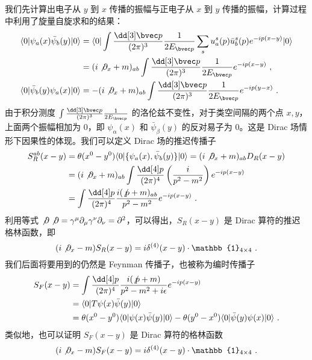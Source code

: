 
我们先计算出电子从 $y$ 到 $x$ 传播的振幅与正电子从 $x$ 到 $y$ 传播的振幅，计算过程中利用了旋量自旋求和的结果：
\begin{equation}
\begin{aligned}
\langle 0 | \psi_a(x) \bar\psi_b(y)|0\rangle &= \langle 0|\int \frac{\dd[3] \bvec p}{(2\pi)^3} \frac{1}{2E_{\bvec p}}\sum_s u^s_a(p)\bar u^s_b(p) e^{-ip(x-y)} |0\rangle\\
&=(i\not \partial_x+m)_{ab}\int \frac{\dd[3] \bvec p}{(2\pi)^3}\frac{1}{2E_{\bvec p}}e^{-ip(x-y)}~,\\
\langle 0 | \bar\psi_b(y) \psi_a(x)|0\rangle &=-(i\not\partial_x +m)_{ab}\int \frac{\dd[3] \bvec p}{(2\pi)^3}\frac{1}{2E_{\bvec p}}e^{-ip(y-x)}~.
\end{aligned}
\end{equation}
由于积分测度 $\int \frac{\dd[3]\bvec  p}{(2\pi)^3}\frac{1}{2E_{\bvec p}}$ 的洛伦兹不变性，对于类空间隔的两个点 $x,y$，上面两个振幅相加为 $0$，即 $\psi_\alpha(x)$ 和 $\bar\psi_\beta(y)$ 的反对易子为 $0$。这是 Dirac 场情形下因果性的体现。我们可以定义 Dirac 场的推迟传播子
\begin{equation}
\begin{aligned}
S^{ab}_R(x-y)&=\theta(x^0-y^0) \langle 0| \{\psi_a(x),\bar\psi_b(y) \} | 0\rangle = (i\not \partial_x+m)_{ab} D_R(x-y)\\
&=(i\not\partial_x+m)_{ab}\int \frac{\dd[4] p}{(2\pi)^4}\left(\frac{i}{p^2-m^2}\right)e^{-ip(x-y)}\\
&=\int \frac{\dd[4] p}{(2\pi)^4}\frac{i(\not p+m)_{ab}}{p^2-m^2}e^{-ip(x-y)}~.
\end{aligned}
\end{equation}
利用等式 $\not \partial \not \partial=\gamma^\mu\partial_\mu\gamma^\nu\partial_\nu=\partial^2$，可以得出，$S_R(x-y)$ 是 Dirac 算符的推迟格林函数，即
\[
(i\not \partial_x-m)S_R(x-y) = i\delta^{(4)}(x-y) \cdot \mathbb{1}_{4\times 4}~.
\]
我们后面将要用到的仍然是 Feynman 传播子，也被称为编时传播子
\begin{equation}
\begin{aligned}
S_F(x-y)&=\int \frac{\dd[4] p}{(2\pi)^4}\frac{i(\not p+m)}{p^2-m^2+i\epsilon}e^{-ip(x-y)}\\
\notag&=\langle 0|T\psi(x)\bar\psi(y)|0\rangle \\
\notag&=\theta(x^0-y^0) \langle 0|\psi(x)\bar\psi(y) |0\rangle -\theta(y^0-x^0)\langle 0|\bar\psi(y)\psi(x)|0\rangle~.
\end{aligned}
\end{equation}
类似地，也可以证明 $S_F(x-y)$ 是 Dirac 算符的格林函数
\[
(i\not \partial_x-m)S_F(x-y) = i\delta^{(4)}(x-y) \cdot \mathbb{1}_{4\times 4}~.
\]
